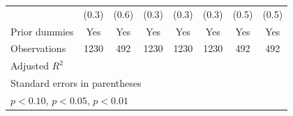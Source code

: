{\begin{tabular}{l*{7}{c}}
                &    (0.3)         &    (0.6)         &    (0.3)         &    (0.3)         &    (0.3)         &    (0.5)         &    (0.5)         \\
Prior dummies   &      Yes         &      Yes         &      Yes         &      Yes         &      Yes         &      Yes         &      Yes         \\
\hline
Observations    &     1230         &      492         &     1230         &     1230         &     1230         &      492         &      492         \\
Adjusted \(R^{2}\)&                  &                  &                  &                  &                  &                  &                  \\
\hline\hline
\multicolumn{8}{l}{\footnotesize Standard errors in parentheses}\\
\multicolumn{8}{l}{\footnotesize \sym{*} \(p<0.10\), \sym{**} \(p<0.05\), \sym{***} \(p<0.01\)}\\
\end{tabular}
}
